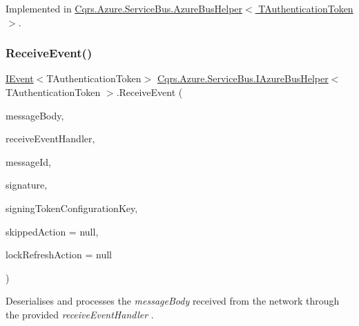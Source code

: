 Implemented in \hyperlink{classCqrs_1_1Azure_1_1ServiceBus_1_1AzureBusHelper_a89f4ae84aad951fa8f4809f3b23a1893_a89f4ae84aad951fa8f4809f3b23a1893}{Cqrs.\+Azure.\+Service\+Bus.\+Azure\+Bus\+Helper$<$ T\+Authentication\+Token $>$}.

\mbox{\label{interfaceCqrs_1_1Azure_1_1ServiceBus_1_1IAzureBusHelper_abca50d70da26664a7f2ff26b4059c903_abca50d70da26664a7f2ff26b4059c903}} 
\subsubsection{\texorpdfstring{Receive\+Event()}{ReceiveEvent()}}
{\footnotesize\ttfamily \hyperlink{interfaceCqrs_1_1Events_1_1IEvent}{I\+Event}$<$T\+Authentication\+Token$>$ \hyperlink{interfaceCqrs_1_1Azure_1_1ServiceBus_1_1IAzureBusHelper}{Cqrs.\+Azure.\+Service\+Bus.\+I\+Azure\+Bus\+Helper}$<$ T\+Authentication\+Token $>$.Receive\+Event (\begin{DoxyParamCaption}\item[{string}]{message\+Body,  }\item[{Func$<$ \hyperlink{interfaceCqrs_1_1Events_1_1IEvent}{I\+Event}$<$ T\+Authentication\+Token $>$, bool?$>$}]{receive\+Event\+Handler,  }\item[{string}]{message\+Id,  }\item[{string}]{signature,  }\item[{string}]{signing\+Token\+Configuration\+Key,  }\item[{Action}]{skipped\+Action = {\ttfamily null},  }\item[{Action}]{lock\+Refresh\+Action = {\ttfamily null} }\end{DoxyParamCaption})}



Deserialises and processes the {\itshape message\+Body}  received from the network through the provided {\itshape receive\+Event\+Handler} . 



